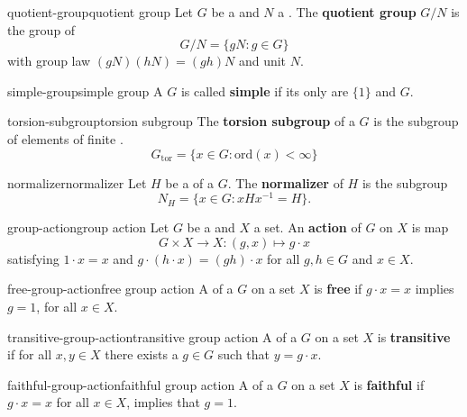 \begin{topic}{quotient-group}{quotient group}
    Let $G$ be a  and $N$ a . The \textbf{quotient group} $G/N$ is the group of 
    \[ G/N = \{ gN : g \in G \} \]
    with group law $(gN)(hN) = (gh)N$ and unit $N$.
\end{topic}

\begin{topic}{simple-group}{simple group}
    A  $G$ is called \textbf{simple} if its only  are $\{ 1 \}$ and $G$.
\end{topic}

\begin{topic}{torsion-subgroup}{torsion subgroup}
    The \textbf{torsion subgroup} of a  $G$ is the subgroup of elements of finite .
    \[ G_{\text{tor}} = \{ x \in G : \text{ord}(x) < \infty \} \]
\end{topic}

\begin{topic}{normalizer}{normalizer}
    Let $H$ be a  of a  $G$. The \textbf{normalizer} of $H$ is the subgroup
    \[ N_H = \{ x \in G : x H x^{-1} = H \} . \]
\end{topic}

\begin{topic}{group-action}{group action}
    Let $G$ be a  and $X$ a set. An \textbf{action} of $G$ on $X$ is map
    \[ G \times X \to X : (g, x) \mapsto g \cdot x \]
    satisfying $1 \cdot x = x$ and $g \cdot (h \cdot x) = (gh) \cdot x$ for all $g, h \in G$ and $x \in X$.
\end{topic}

\begin{topic}{free-group-action}{free group action}
    A  of a  $G$ on a set $X$ is \textbf{free} if $g \cdot x = x$ implies $g = 1$, for all $x \in X$.
\end{topic}

\begin{topic}{transitive-group-action}{transitive group action}
    A  of a  $G$ on a set $X$ is \textbf{transitive} if for all $x, y \in X$ there exists a $g \in G$ such that $y = g \cdot x$.
\end{topic}

\begin{topic}{faithful-group-action}{faithful group action}
    A  of a  $G$ on a set $X$ is \textbf{faithful} if $g \cdot x = x$ for all $x \in X$, implies that $g = 1$.
\end{topic}

